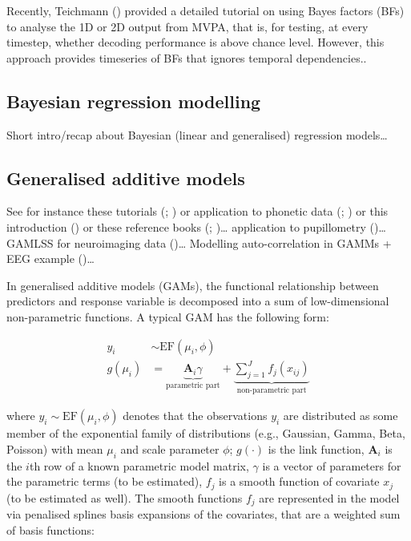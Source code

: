 \documentclass[
  doc,
  floatsintext,
  longtable,
  a4paper,
  nolmodern,
  notxfonts,
  notimes,
  colorlinks=true,linkcolor=blue,citecolor=blue,urlcolor=blue]{apa7}
\begin{document}
Recently, Teichmann () provided a
detailed tutorial on using Bayes factors (BFs) to analyse the 1D or 2D
output from MVPA, that is, for testing, at every timestep, whether
decoding performance is above chance level. However, this approach
provides timeseries of BFs that ignores temporal dependencies..

\subsection{Bayesian regression
modelling}\label{bayesian-regression-modelling}

Short intro/recap about Bayesian (linear and generalised) regression
models\ldots{}

\subsection{Generalised additive
models}\label{generalised-additive-models}

See for instance these tutorials
(;
) or application to
phonetic data (;
) or this introduction
() or these reference
books (;
)\ldots{} application to
pupillometry ()\ldots{}
GAMLSS for neuroimaging data ()\ldots{} Modelling auto-correlation in GAMMs + EEG example
()\ldots{}

In generalised additive models (GAMs), the functional relationship
between predictors and response variable is decomposed into a sum of
low-dimensional non-parametric functions. A typical GAM has the
following form:

\[
\begin{aligned} 
y_{i} &\sim \mathrm{EF}\left(\mu_{i}, \phi\right)\\
g\left(\mu_i\right) &= \underbrace{\mathbf{A}_{i} \gamma}_{\text{parametric part}} + \underbrace{\sum_{j=1}^{J} f_{j}\left(x_{ij}\right)}_{\text{non-parametric part}}
\end{aligned}
\]

where \(y_{i} \sim \mathrm{EF}\left(\mu_{i}, \phi\right)\) denotes that
the observations \(y_{i}\) are distributed as some member of the
exponential family of distributions (e.g., Gaussian, Gamma, Beta,
Poisson) with mean \(\mu_{i}\) and scale parameter \(\phi\);
\(g(\cdot)\) is the link function, \(\mathbf{A}_{i}\) is the \(i\)th row
of a known parametric model matrix, \(\gamma\) is a vector of parameters
for the parametric terms (to be estimated), \(f_{j}\) is a smooth
function of covariate \(x_{j}\) (to be estimated as well). The smooth
functions \(f_{j}\) are represented in the model via penalised splines
basis expansions of the covariates, that are a weighted sum of basis
functions:
\end{document}

